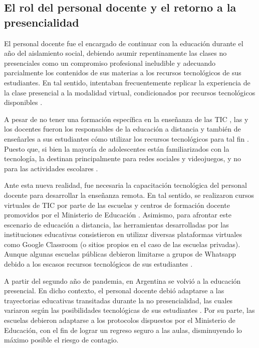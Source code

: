 \documentclass[spanish]{textolivre}
\begin{document}
\subsection{El rol del personal docente y el retorno a la presencialidad}\label{sec-formato}
El personal docente fue el encargado de continuar con la educación durante el año del aislamiento social, debiendo asumir repentinamente las clases no presenciales como un compromiso profesional ineludible y adecuando parcialmente los contenidos de sus materias a los recursos tecnológicos de sus estudiantes. En tal sentido, intentaban frecuentemente replicar la experiencia de la clase presencial a la modalidad virtual, condicionados por recursos tecnológicos disponibles \cite{picon_desempeno_2021}.

A pesar de no tener una formación específica en la enseñanza de las TIC \cite{martin_en_2019}, las y los docentes fueron los responsables de la educación a distancia y también de enseñarles a sus estudiantes cómo utilizar los recursos tecnológicos para tal fin \cite{bonilla-guachamin_dos_2020}. Puesto que, si bien la mayoría de adolescentes están familiarizados con la tecnología, la destinan principalmente para redes sociales y videojuegos, y no para las actividades escolares \cite{gewerc_ninos_2017}. 

Ante esta nueva realidad, fue necesaria la capacitación tecnológica del personal docente para desarrollar la enseñanza remota. En tal sentido, se realizaron cursos virtuales de TIC por parte de las escuelas y centros de formación docente promovidos por el Ministerio de Educación \cite{de_giusti_reflexiones_2021}. Asimismo, para afrontar este escenario de educación a distancia, las herramientas desarrolladas por las instituciones educativas consistieron en utilizar diversas plataformas virtuales como Google Classroom (o sitios propios en el caso de las escuelas privadas). Aunque algunas escuelas públicas debieron limitarse a grupos de Whatsapp debido a los escasos recursos tecnológicos de sus estudiantes \cite{anderete_schwal_pandemia_2022}. 

A partir del segundo año de pandemia, en Argentina se volvió a la educación presencial. En dicho contexto, el personal docente debió adaptarse a las trayectorias educativas transitadas durante la no presencialidad, las cuales variaron según las posibilidades tecnológicas de sus estudiantes \cite{exposito_percepcion_2021}. Por su parte, las escuelas debieron adaptarse a los protocolos dispuestos por el Ministerio de Educación, con el fin de lograr un regreso seguro a las aulas, disminuyendo lo máximo posible el riesgo de contagio.
\end{document}
